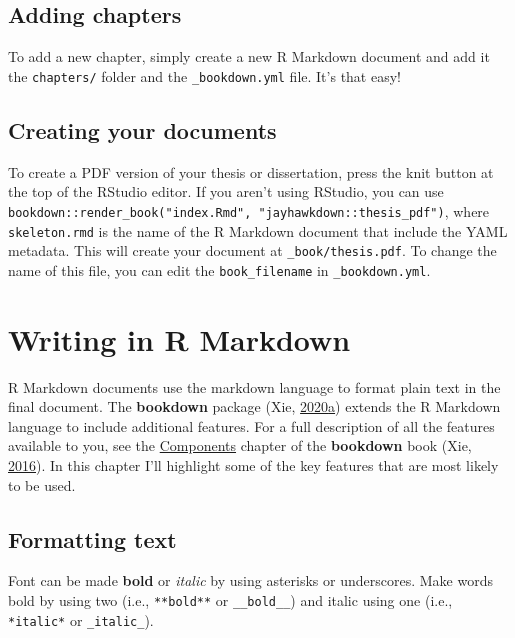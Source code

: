 \documentclass[12pt,english]{kuthesis}
\begin{document}
\hypertarget{adding-chapters}{%
\section{Adding chapters}\label{adding-chapters}}

To add a new chapter, simply create a new R Markdown document and add it the \texttt{chapters/} folder and the \texttt{\_bookdown.yml} file. It's that easy!

\hypertarget{creating-your-documents}{%
\section{Creating your documents}\label{creating-your-documents}}

To create a PDF version of your thesis or dissertation, press the knit button at the top of the RStudio editor. If you aren't using RStudio, you can use \texttt{bookdown::render\_book("index.Rmd",\ "jayhawkdown::thesis\_pdf")}, where \texttt{skeleton.rmd} is the name of the R Markdown document that include the YAML metadata. This will create your document at \texttt{\_book/thesis.pdf}. To change the name of this file, you can edit the \texttt{book\_filename} in \texttt{\_bookdown.yml}.

\hypertarget{writing-in-r-markdown}{%
\chapter{Writing in R Markdown}\label{writing-in-r-markdown}}

R Markdown documents use the markdown language to format plain text in the final document. The \textbf{bookdown} package (Xie, \protect\hyperlink{ref-R-bookdown}{2020}\protect\hyperlink{ref-R-bookdown}{a}) extends the R Markdown language to include additional features. For a full description of all the features available to you, see the \href{https://bookdown.org/yihui/bookdown/components.html}{Components} chapter of the \textbf{bookdown} book (Xie, \protect\hyperlink{ref-bookdown}{2016}). In this chapter I'll highlight some of the key features that are most likely to be used.

\hypertarget{format}{%
\section{Formatting text}\label{format}}

Font can be made \textbf{bold} or \emph{italic} by using asterisks or underscores. Make words bold by using two (i.e., \texttt{**bold**} or \texttt{\_\_bold\_\_}) and italic using one (i.e., \texttt{*italic*} or \texttt{\_italic\_}).
\end{document}
